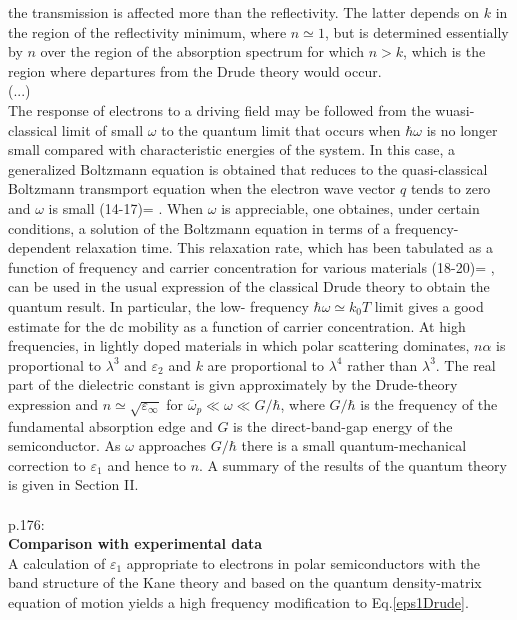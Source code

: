 the transmission is affected more than the reflectivity. The latter depends on
$k$ in the region of the reflectivity minimum, where $n \simeq 1$, but is determined 
essentially by $n$ over the region of the absorption spectrum for which $n > k$,
which is the region where departures from the Drude theory would occur.
\\
(...)
\\
The response of electrons to a driving field may be followed from the wuasi-classical
limit of small $\omega$ to the quantum limit that occurs when $\hbar \omega$ is no longer small
compared with characteristic energies of the system. In this case, a generalized Boltzmann equation
is obtained that reduces to the quasi-classical Boltzmann transmport equation when the electron wave 
vector $q$ tends to zero and $\omega$ is small (14-17)=
\cite{Jensen1975,Price1966,Argyres1961,Kohn1958}
. When $\omega$ is appreciable, one obtaines,
under certain conditions, a solution of the Boltzmann equation in terms of a frequency-dependent
relaxation time. This relaxation rate, which has been tabulated as a function of frequency and 
carrier concentration for various materials (18-20)=
\cite{Jensen1977,Jensen1979,Jensen1981}
, can be used in the usual expression of the 
classical Drude theory to obtain the quantum result. In particular, the low-
frequency $\hbar\omega \simeq k_0T$ limit gives a good estimate for the dc mobility as a function
of carrier concentration. At high frequencies, in lightly doped materials in which
polar scattering dominates, $n\alpha$ is proportional to $\lambda^3$ and $\varepsilon_2$ and $k$
are proportional to $\lambda^4$ rather than $\lambda^3$. The real part of the dielectric constant
is givn approximately by the Drude-theory expression and $n \simeq \sqrt{\varepsilon_{\infty}}$
for $\bar\omega_p \ll \omega \ll G/\hbar$, where $G/\hbar$ is the frequency of the fundamental absorption
edge and $G$ is the direct-band-gap energy of the semiconductor. As $\omega$ approaches $G/\hbar$ there
is a small quantum-mechanical correction to $\varepsilon_1$ and hence to $n$.
A summary of the results of the quantum theory is given in Section II.
\\
\\
p.176:\\
\textbf{Comparison with experimental data}\\
A calculation of $\varepsilon_1$ appropriate to electrons in polar semiconductors with the
band structure of the Kane theory and based on the quantum density-matrix equation of motion yields a 
high frequency modification to Eq.\eqref{eps1Drude}. 
